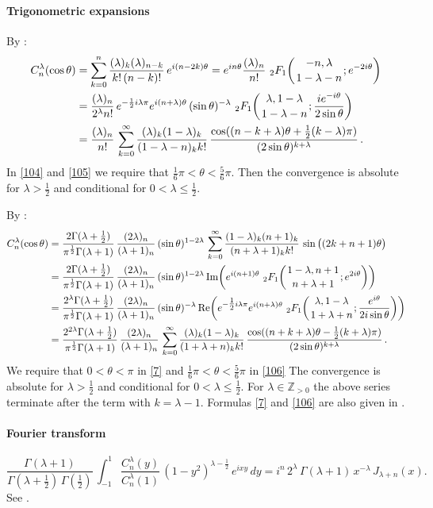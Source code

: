\documentclass[twoside,11pt]{article}
\newcommand\ZZ{\mathbb{Z}}
\newcommand\tha\theta
\newcommand\la\lambda
\newcommand\Ga{\Gamma}
\newcommand\half{\frac12}
\newcommand\thalf{\tfrac12}
\newcommand\iy\infty
\newcommand\Zpos{\ZZ_{>0}}
\newcommand{\hyp}[5]{\,\mbox{}_{#1}F_{#2}\!\left(
  \genfrac{}{}{0pt}{}{#3}{#4};#5\right)}
\renewcommand\Re{{\rm Re}\,}
\renewcommand\Im{{\rm Im}\,}
\begin{document}
\paragraph{Trigonometric expansions}
By :
\begin{align}
C_n^{\la}(\cos\tha)
&=\sum_{k=0}^n\frac{(\la)_k(\la)_{n-k}}{k!\,(n-k)!}\,e^{i(n-2k)\tha}
=e^{in\tha}\frac{(\la)_n}{n!}\,
\hyp21{-n,\la}{1-\la-n}{e^{-2i\tha}}\label{103}\\
&=\frac{(\la)_n}{2^\la n!}\,
e^{-\half i\la\pi}e^{i(n+\la)\tha}\,(\sin\tha)^{-\la}\,
\hyp21{\la,1-\la}{1-\la-n}{\frac{i e^{-i\tha}}{2\sin\tha}}\label{104}\\
&=\frac{(\la)_n}{n!}\,\sum_{k=0}^\iy\frac{(\la)_k(1-\la)_k}{(1-\la-n)_k k!}\,
\frac{\cos((n-k+\la)\tha+\thalf(k-\la)\pi)}{(2\sin\tha)^{k+\la}}\,.\label{105}
\end{align}
In \eqref{104} and \eqref{105} we require that
$\tfrac16\pi<\tha<\tfrac56\pi$. Then the convergence is absolute for $\la>\thalf$
and conditional for $0<\la\le\thalf$.

By \mycite{DLMF}{(14.13.1), (14.3.21), (15.8.1)]}:
\begin{align}
C_n^\la(\cos\tha)&=\frac{2\Ga(\la+\thalf)}{\pi^\half\Ga(\la+1)}\,
\frac{(2\la)_n}{(\la+1)_n}\,(\sin\tha)^{1-2\la}\,
\sum_{k=0}^\iy\frac{(1-\la)_k(n+1)_k}{(n+\la+1)_k k!}\,
\sin\big((2k+n+1)\tha\big)
\label{7}\\
&=\frac{2\Ga(\la+\thalf)}{\pi^\half\Ga(\la+1)}\,
\frac{(2\la)_n}{(\la+1)_n}\,(\sin\tha)^{1-2\la}\,
\Im\!\!\left(e^{i(n+1)\tha}\,\hyp21{1-\la,n+1}{n+\la+1}{e^{2i\tha}}\right)\nonumber\\
&=\frac{2^\la\Ga(\la+\thalf)}{\pi^\half\Ga(\la+1)}\,
\frac{(2\la)_n}{(\la+1)_n}\,(\sin\tha)^{-\la}\,
\Re\!\!\left(e^{-\thalf i\la\pi}e^{i(n+\la)\tha}\,
\hyp21{\la,1-\la}{1+\la+n}{\frac{e^{i\tha}}{2i\sin\tha}}\right)\nonumber\\
&=\frac{2^{2\la}\Ga(\la+\thalf)}{\pi^\half\Ga(\la+1)}\,\frac{(2\la)_n}{(\la+1)_n}\,
\sum_{k=0}^\iy\frac{(\la)_k(1-\la)_k}{(1+\la+n)_k k!}\,
\frac{\cos((n+k+\la)\tha-\thalf(k+\la)\pi)}{(2\sin\tha)^{k+\la}}\,.
\label{106}
\end{align}
We require that $0<\tha<\pi$ in \eqref{7} and $\tfrac16\pi<\tha<\tfrac56\pi$ in
\eqref{106} The convergence is absolute for $\la>\thalf$ and conditional for
$0<\la\le\thalf$.
For $\la\in\Zpos$ the above series terminate after the term with
$k=\la-1$.
Formulas \eqref{7} and \eqref{106} are also given in
.
%
\paragraph{Fourier transform}
\begin{equation}
\frac{\Ga(\la+1)}{\Ga(\la+\thalf)\,\Ga(\thalf)}\,
\int_{-1}^1 \frac{C_n^\la(y)}{C_n^\la(1)}\,(1-y^2)^{\la-\half}\,
e^{ixy}\,dy
=i^n\,2^\la\,\Ga(\la+1)\,x^{-\la}\,J_{\la+n}(x).
\label{8}
\end{equation}
See .
%
\end{document}
